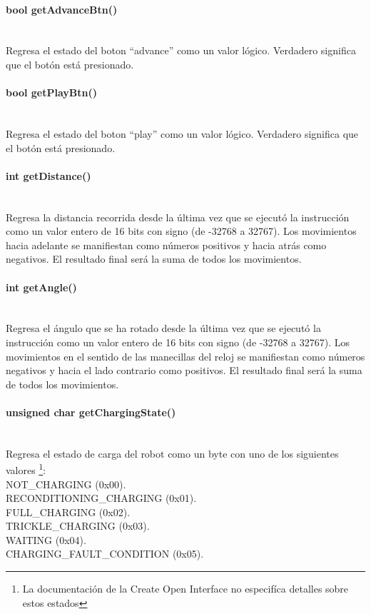 \documentclass[letterpaper,openright,12pt]{book}
\begin{document}
\paragraph{bool getAdvanceBtn()}\mbox{}\\
Regresa el estado del boton ``advance'' como un valor lógico. Verdadero significa que el botón está presionado.\\
\paragraph{bool getPlayBtn()}\mbox{}\\
Regresa el estado del boton ``play'' como un valor lógico. Verdadero significa que el botón está presionado.\\
\paragraph{int getDistance()}\mbox{}\\
Regresa la distancia recorrida desde la última vez que se ejecutó la instrucción como un valor entero de 16 bits con signo (de -32768 a 32767). Los movimientos hacia adelante se manifiestan como números positivos y hacia atrás como negativos. El resultado final será la suma de todos los movimientos.\\
\paragraph{int getAngle()}\mbox{}\\
Regresa el ángulo que se ha rotado desde la última vez que se ejecutó la instrucción como un valor entero de 16 bits con signo (de -32768 a 32767). Los movimientos en el sentido de las manecillas del reloj se manifiestan como números negativos y hacia el lado contrario como positivos. El resultado final será la suma de todos los movimientos.\\

\paragraph{unsigned char getChargingState()}\mbox{}\\
Regresa el estado de carga del robot como un byte con uno de los siguientes valores \footnote{La documentación de la Create Open Interface no especifíca detalles sobre estos estados}:\\
NOT\_CHARGING (0x00). \\
RECONDITIONING\_CHARGING (0x01). \\
FULL\_CHARGING (0x02).\\
TRICKLE\_CHARGING (0x03).\\
WAITING (0x04).\\
CHARGING\_FAULT\_CONDITION (0x05).\\
\end{document}
